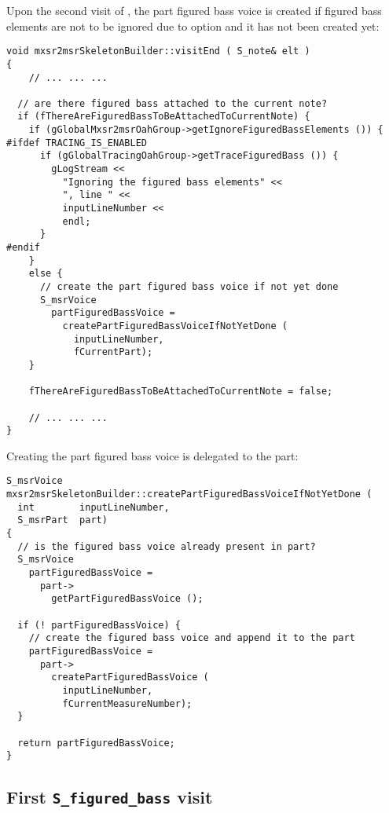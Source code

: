 Upon the second visit of , the part figured bass voice is created if figured bass elements are not to be ignored due to option  and it has not been created yet:
\begin{lstlisting}[language=CPlusPlus]
void mxsr2msrSkeletonBuilder::visitEnd ( S_note& elt )
{
	// ... ... ...

  // are there figured bass attached to the current note?
  if (fThereAreFiguredBassToBeAttachedToCurrentNote) {
    if (gGlobalMxsr2msrOahGroup->getIgnoreFiguredBassElements ()) {
#ifdef TRACING_IS_ENABLED
      if (gGlobalTracingOahGroup->getTraceFiguredBass ()) {
        gLogStream <<
          "Ignoring the figured bass elements" <<
          ", line " <<
          inputLineNumber <<
          endl;
      }
#endif
    }
    else {
      // create the part figured bass voice if not yet done
      S_msrVoice
        partFiguredBassVoice =
          createPartFiguredBassVoiceIfNotYetDone (
            inputLineNumber,
            fCurrentPart);
    }

    fThereAreFiguredBassToBeAttachedToCurrentNote = false;

	// ... ... ...
}
\end{lstlisting}

Creating the part figured bass voice is delegated to the part:
\begin{lstlisting}[language=CPlusPlus]
S_msrVoice mxsr2msrSkeletonBuilder::createPartFiguredBassVoiceIfNotYetDone (
  int        inputLineNumber,
  S_msrPart  part)
{
  // is the figured bass voice already present in part?
  S_msrVoice
    partFiguredBassVoice =
      part->
        getPartFiguredBassVoice ();

  if (! partFiguredBassVoice) {
    // create the figured bass voice and append it to the part
    partFiguredBassVoice =
      part->
        createPartFiguredBassVoice (
          inputLineNumber,
          fCurrentMeasureNumber);
  }

  return partFiguredBassVoice;
}
\end{lstlisting}


\subsection{First {\tt S_figured_bass} visit}

